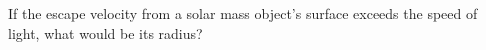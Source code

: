 If the escape velocity from a solar mass object's surface exceeds the speed of
light, what would be its radius?
